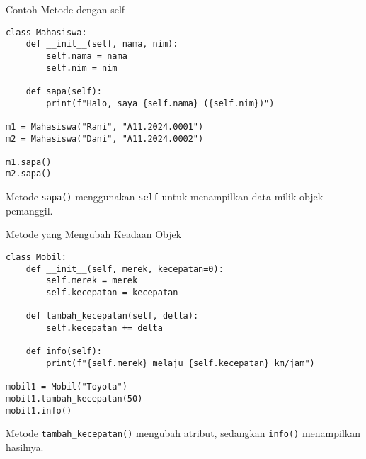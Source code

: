 \documentclass[aspectratio=169, table]{beamer}
\begin{document}
\begin{frame}[fragile]{Contoh Metode dengan self}
\vspace{20pt}
\begin{lstlisting}[style=PythonStyle]
class Mahasiswa:
    def __init__(self, nama, nim):
        self.nama = nama
        self.nim = nim

    def sapa(self):
        print(f"Halo, saya {self.nama} ({self.nim})")

m1 = Mahasiswa("Rani", "A11.2024.0001")
m2 = Mahasiswa("Dani", "A11.2024.0002")

m1.sapa()
m2.sapa()
\end{lstlisting}
Metode \texttt{sapa()} menggunakan \texttt{self} untuk menampilkan data milik objek pemanggil.
\end{frame}

\begin{frame}[fragile]{Metode yang Mengubah Keadaan Objek}
\vspace{10pt}
\begin{lstlisting}[style=PythonStyle]
class Mobil:
    def __init__(self, merek, kecepatan=0):
        self.merek = merek
        self.kecepatan = kecepatan

    def tambah_kecepatan(self, delta):
        self.kecepatan += delta

    def info(self):
        print(f"{self.merek} melaju {self.kecepatan} km/jam")

mobil1 = Mobil("Toyota")
mobil1.tambah_kecepatan(50)
mobil1.info()
\end{lstlisting}
Metode \texttt{tambah\_kecepatan()} mengubah atribut, sedangkan \texttt{info()} menampilkan hasilnya.
\end{frame}
\end{document}
